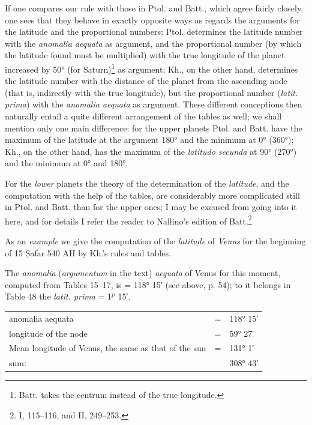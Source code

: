 \documentclass[11pt]{article}
\begin{document}
\par If one compares our rule with those in Ptol. and Batt., which agree fairly closely, one sees that they behave in exactly opposite ways as regards the arguments for the latitude and the proportional numbers: Ptol. determines the latitude number with the \emph{anomalia aequata} as argument, and the proportional number (by which the latitude found must be multiplied) with the true longitude of the planet increased by 50° (for Saturn)\footnote{Batt. takes the centrum instead of the true longitude.} as argument; Kh., on the other hand, determines the latitude number with the distance of the planet from the ascending node (that is, indirectly with the true longitude), but the proportional number (\emph{latit. prima}) with the \emph{anomalia aequata} as argument. These different conceptions then naturally entail a quite different arrangement of the tables as well; we shall mention only one main difference: for the upper planets Ptol. and Batt. have the maximum of the latitude at the argument 180° and the minimum at 0° (360°); Kh., on the other hand, has the maximum of the \emph{latitudo secunda} at 90° (270°) and the minimum at 0° and 180°.\par
\par For the \emph{lower} planets the theory of the determination of the \emph{latitude}, and the computation with the help of the tables, are considerably more complicated still in Ptol. and Batt. than for the upper ones; I may be excused from going into it here, and for details I refer the reader to Nallino's edition of Batt.\footnote{I, 115–116, and II, 249–253.}\par
\par As an \emph{example} we give the computation of the \emph{latitude} of \emph{Venus} for the beginning of 15 Ṣafar 540 AH by Kh.'s rules and tables.\par
\par The \emph{anomalia} (\emph{argumentum} in the text) \emph{aequata} of Venus for this moment, computed from Tables 15–17, is = 118° 15′ (see above, p. 54); to it belongs in Table 48 the \emph{latit. prima} = 1$^{p}$ 15′.\par
\begin{center}\small\begin{tabular}{lcl}
anomalia aequata & = & 118° 15′ \\
longitude of the node & = & 59° 27′ \\
Mean longitude of Venus, the same as that of the sun & = & 131° 1′ \\
sum: &  & 308° 43′ \\
\end{tabular}\end{center}
\end{document}
